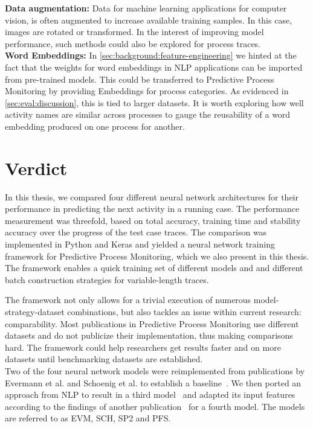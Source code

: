 \noindent\textbf{Data augmentation:} Data for machine learning applications for computer vision, is often augmented to increase available training samples. In this case, images are rotated or transformed. In the interest of improving model performance, such methods could also be explored for process traces.\\

\noindent\textbf{Word Embeddings:} In \autoref{sec:background:feature-engineering} we hinted at the fact that the weights for word embeddings in NLP applications can be imported from pre-trained models. This could be transferred to Predictive Process Monitoring by providing Embeddings for process categories. As evidenced in \autoref{sec:eval:discussion}, this is tied to larger datasets. It is worth exploring how well activity names are similar across processes to gauge the reusability of a word embedding produced on one process for another.

\section{Verdict} \label{sec:conclusion:verdict}
In this thesis, we compared four different neural network architectures for their performance in predicting the next activity in a running case. The performance measurement was threefold, based on total accuracy, training time and stability accuracy over the progress of the test case traces. The comparison was implemented in Python and Keras and yielded a neural network training framework for Predictive Process Monitoring, which we also present in this thesis. The framework enables a quick training set of different models and and different batch construction strategies for variable-length traces.

The framework not only allows for a trivial execution of numerous model-strategy-dataset combinations, but also tackles an issue within current research: comparability. Most publications in Predictive Process Monitoring use different datasets and do not publicize their implementation, thus making comparisons hard. The framework could help researchers get results faster and on more datasets until benchmarking datasets are established.\\

Two of the four neural network models were reimplemented from publications by Evermann et al. and Schoenig et al. to establish a baseline~\cite{evermann2016, schoenig2018}. We then ported an approach from NLP to result in a third model~\cite{shibata2016bipartite} and adapted its input features according to the findings of another publication~\cite{klinkmuller2018reliablemonitoring} for a fourth model. The models are referred to as EVM, SCH, SP2 and PFS.

